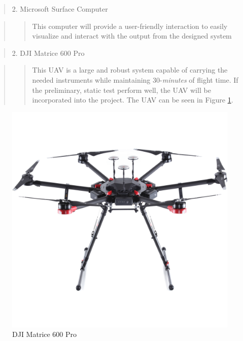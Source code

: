 \documentclass{sigchi}
\begin{document}
\begin{quote}
    2. Microsoft Surface Computer
\end{quote} 

\begin{quote}
    \begin{quote}
       This computer will provide a user-friendly interaction to easily visualize and interact with the output from the designed system
    \end{quote}
\end{quote}

\begin{quote}
    2. DJI Matrice 600 Pro
\end{quote} 

\begin{quote}
    \begin{quote}
       This UAV is a large and robust system capable of carrying the needed instruments while maintaining 30-\textit{minutes} of flight time. If the preliminary, static test perform well, the UAV will be incorporated into the project. The UAV can be seen in Figure \ref{fig:2}.
    \end{quote}
\end{quote}

\begin{figure}
\centering
    \includegraphics[width=0.9\columnwidth]{Figures/M600.jpg}
    \caption{DJI Matrice 600 Pro}
    \label{fig:2}
\end{figure}
\end{document}
